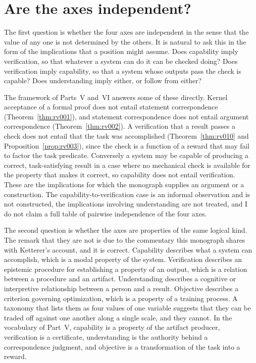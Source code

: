 \section{Are the axes independent?}

The first question is whether the four axes are independent in the sense that the value of any one is not determined by the others. It is natural to ask this in the form of the implications that a position might assume. Does capability imply verification, so that whatever a system can do it can be checked doing? Does verification imply capability, so that a system whose outputs pass the check is capable? Does understanding imply either, or follow from either?

The framework of Parts~V and~VI answers some of these directly. Kernel acceptance of a formal proof does not entail statement correspondence (Theorem~\ref{thm:rv001}), and statement correspondence does not entail argument correspondence (Theorem~\ref{thm:rv002}). A verification that a result passes a check does not entail that the task was accomplished (Theorem~\ref{thm:rv010} and Proposition~\ref{prop:rv003}), since the check is a function of a reward that may fail to factor the task predicate. Conversely a system may be capable of producing a correct, task-satisfying result in a case where no mechanical check is available for the property that makes it correct, so capability does not entail verification. These are the implications for which the monograph supplies an argument or a construction. The capability-to-verification case is an informal observation and is not constructed, the implications involving understanding are not treated, and I do not claim a full table of pairwise independence of the four axes.

The second question is whether the axes are properties of the same logical kind. The remark that they are not is due to the commentary this monograph shares with Ketterer's account, and it is correct. Capability describes what a system can accomplish, which is a modal property of the system. Verification describes an epistemic procedure for establishing a property of an output, which is a relation between a procedure and an artifact. Understanding describes a cognitive or interpretive relationship between a person and a result. Objective describes a criterion governing optimization, which is a property of a training process. A taxonomy that lists them as four values of one variable suggests that they can be traded off against one another along a single scale, and they cannot. In the vocabulary of Part~V, capability is a property of the artifact producer, verification is a certificate, understanding is the authority behind a correspondence judgment, and objective is a transformation of the task into a reward.

